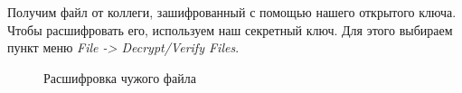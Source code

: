 \documentclass[10pt,a4paper]{report}
\begin{document}
Получим файл от коллеги,  зашифрованный с помощью нашего открытого ключа. Чтобы расшифровать его, используем наш секретный ключ. Для этого выбираем пункт меню \textit{File -> Decrypt/Verify Files}.
\begin{figure}[h]	
\caption{Расшифровка чужого файла}
\label{ris:image14}
\end{figure}
\end{document}
